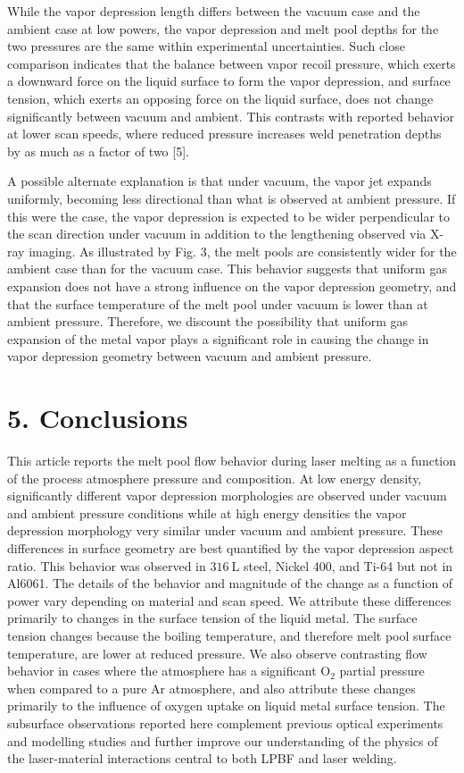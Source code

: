 \documentclass[10pt]{article}
\begin{document}
While the vapor depression length differs between the vacuum case and the ambient case at low powers, the vapor depression and melt pool depths for the two pressures are the same within experimental uncertainties. Such close comparison indicates that the balance between vapor recoil pressure, which exerts a downward force on the liquid surface to form the vapor depression, and surface tension, which exerts an opposing force on the liquid surface, does not change significantly between vacuum and ambient. This contrasts with reported behavior at lower scan speeds, where reduced pressure increases weld penetration depths by as much as a factor of two [5].

A possible alternate explanation is that under vacuum, the vapor jet expands uniformly, becoming less directional than what is observed at ambient pressure. If this were the case, the vapor depression is expected to be wider perpendicular to the scan direction under vacuum in addition to the lengthening observed via X-ray imaging. As illustrated by Fig. 3, the melt pools are consistently wider for the ambient case than for the vacuum case. This behavior suggests that uniform gas expansion does not have a strong influence on the vapor depression geometry, and that the surface temperature of the melt pool under vacuum is lower than at ambient pressure. Therefore, we discount the possibility that uniform gas expansion of the metal vapor plays a significant role in causing the change in vapor depression geometry between vacuum and ambient pressure.

\section*{5. Conclusions}
This article reports the melt pool flow behavior during laser melting as a function of the process atmosphere pressure and composition. At low energy density, significantly different vapor depression morphologies are observed under vacuum and ambient pressure conditions while at high energy densities the vapor depression morphology very similar under vacuum and ambient pressure. These differences in surface geometry are best quantified by the vapor depression aspect ratio. This behavior was observed in $316 \mathrm{~L}$ steel, Nickel 400, and Ti-64 but not in Al6061. The details of the behavior and magnitude of the change as a function of power vary depending on material and scan speed. We attribute these differences primarily to changes in the surface tension of the liquid metal. The surface tension changes because the boiling temperature, and therefore melt pool surface temperature, are lower at reduced pressure. We also observe contrasting flow behavior in cases where the atmosphere has a significant $\mathrm{O}_{2}$ partial pressure when compared to a pure Ar atmosphere, and also attribute these changes primarily to the influence of oxygen uptake on liquid metal surface tension. The subsurface observations reported here complement previous optical experiments and modelling studies and further improve our understanding of the physics of the laser-material interactions central to both LPBF and laser welding.
\end{document}
